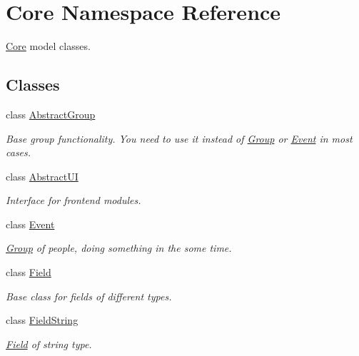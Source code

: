 \hypertarget{namespaceCore}{
\section{Core Namespace Reference}
\label{d3/d7a/namespaceCore}
}


\hyperlink{namespaceCore}{Core} model classes.  


\subsection*{Classes}
\begin{DoxyCompactItemize}
\item 
class \hyperlink{classCore_1_1AbstractGroup}{AbstractGroup}
\begin{DoxyCompactList}\small\item\em Base group functionality. You need to use it instead of \hyperlink{classCore_1_1Group}{Group} or \hyperlink{classCore_1_1Event}{Event} in most cases. \item\end{DoxyCompactList}\item 
class \hyperlink{classCore_1_1AbstractUI}{AbstractUI}
\begin{DoxyCompactList}\small\item\em Interface for frontend modules. \item\end{DoxyCompactList}\item 
class \hyperlink{classCore_1_1Event}{Event}
\begin{DoxyCompactList}\small\item\em \hyperlink{classCore_1_1Group}{Group} of people, doing something in the some time. \item\end{DoxyCompactList}\item 
class \hyperlink{classCore_1_1Field}{Field}
\begin{DoxyCompactList}\small\item\em Base class for fields of different types. \item\end{DoxyCompactList}\item 
class \hyperlink{classCore_1_1FieldString}{FieldString}
\begin{DoxyCompactList}\small\item\em \hyperlink{classCore_1_1Field}{Field} of string type. \item\end{DoxyCompactList}\item 

\end{DoxyCompactItemize}
